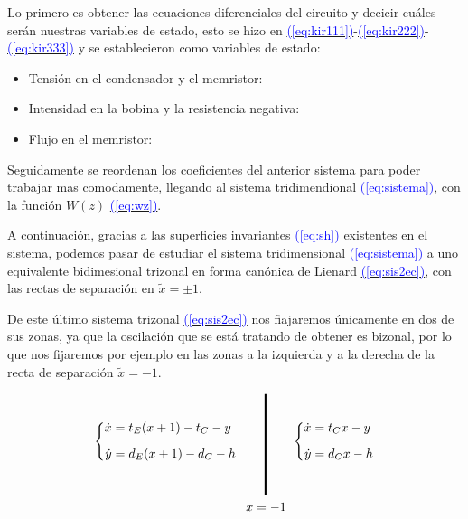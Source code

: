 \documentclass[12pt,a4paper]{report} %
\newcommand{\eref}[1]{\hyperref[#1]{\textcolor{blue}{(\ref*{#1})}}}
\newcommand{\eref}[1]{\hyperref[#1]{\textcolor{blue}{\textit{(\ref*{#1})}}}}
\begin{document}
	\vspace{0.5cm} Lo primero es obtener las ecuaciones diferenciales del circuito y decicir cuáles serán nuestras variables de estado, esto se hizo en \eref{eq:kir111}-\eref{eq:kir222}-\eref{eq:kir333} y se establecieron como variables de estado:
	
	\begin{itemize}
		\item Tensión en el condensador y el memristor: 
		\item Intensidad en la bobina y la resistencia negativa: 
		\item Flujo en el memristor: 
	\end{itemize}
	
	\vspace{0.5cm} Seguidamente se reordenan los coeficientes del anterior sistema para poder trabajar mas comodamente, llegando al sistema tridimendional \eref{eq:sistema}, con la función $W(z)$ \eref{eq:wz}.
	
	\vspace{0.5cm} A continuación, gracias a las superficies invariantes \eref{eq:sh} existentes en el sistema, podemos pasar de estudiar el sistema tridimensional \eref{eq:sistema} a uno equivalente bidimesional trizonal en forma canónica de Lienard \eref{eq:sis2ec}, con las rectas de separación en $\tilde{x}=\pm1$.
	
	\vspace{0.5cm} De este último sistema trizonal \eref{eq:sis2ec} nos fiajaremos únicamente en dos de sus zonas, ya que la oscilación que se está tratando de obtener es bizonal, por lo que nos fijaremos por ejemplo en las zonas a la izquierda y a la derecha de la recta de separación $\tilde{x}=-1$.
	
	\begin{equation}
		\label{eq:sisbiz}
		\begin{gathered}
			\left\{
			\begin{aligned}
				\dot{x}&=t_E(x+1)-t_C-y
				\\[2mm]
				\dot{y}&=d_E(x+1)-d_C-h
			\end{aligned}
			\right. \qquad 
			\rule[-40pt]{1.5pt}{80pt} \qquad 
			\left\{
			\begin{aligned}
				\dot{x}&=t_Cx-y
				\\[2mm]
				\dot{y}&=d_Cx-h
			\end{aligned}
			\right. \\ \quad\qquad\qquad x=-1
		\end{gathered}
	\end{equation}\smallskip
	
\end{document}
